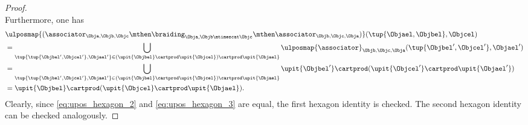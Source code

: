 \begin{proof}
\begin{equation*}
    \end{equation*}
    Furthermore, one has
    \begin{equation}
        \label{eq:upos_hexagon_3}
        \begin{aligned}
             & \ulposmap{(\associator_{\Obja,\Objb,\Objc} \mthen \braiding_{\Obja,\Objb\mtimescat \Objc}\mthen \associator_{\Objb,\Objc,\Obja})}(\tup{\Objael,\Objbel},\Objcel)                                            \\
             & =\bigcup_{\tup{\tup{\Objbel',\Objcel'},\Objael'}\in (\upit\{\Objbel\} \cartprod \upit \{ \Objcel\})\cartprod \upit\{ \Objael\}}\ulposmap{\associator}_{\Objb,\Objc,\Obja}(\tup{\Objbel',\Objcel'},\Objael') \\
             & =\bigcup_{\tup{\tup{\Objbel',\Objcel'},\Objael'}\in (\upit\{\Objbel\} \cartprod \upit \{ \Objcel\})\cartprod \upit\{ \Objael\}}\upit\{\Objbel'\}\cartprod (\upit\{\Objcel'\}\cartprod \upit\{\Objael'\})    \\
             & =\upit\{\Objbel\} \cartprod (\upit \{\Objcel\}\cartprod \upit\{ \Objael\}).
        \end{aligned}
    \end{equation}
    Clearly, since \cref{eq:upos_hexagon_2} and \cref{eq:upos_hexagon_3} are equal, the first hexagon identity is checked.
    The second hexagon identity can be checked analogously.
\end{proof}

